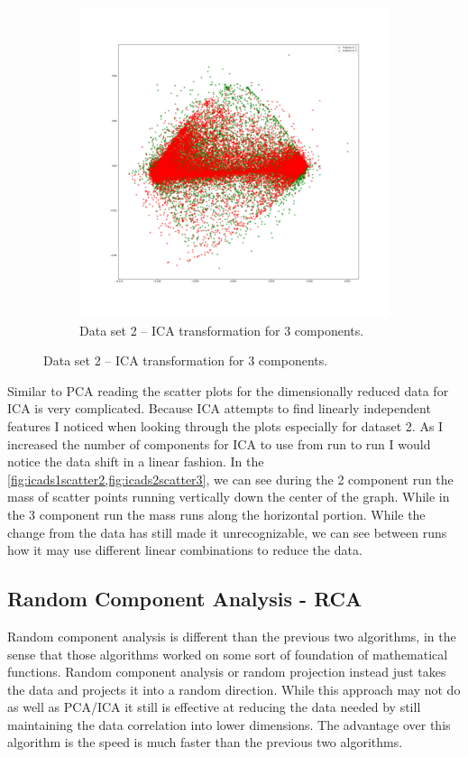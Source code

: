 \documentclass[
letterpaper, %
]{IEEEtran}
\begin{document}
	\begin{figure}[ht]\ContinuedFloat
		\begin{subfigure}{.5\textwidth}
			\centering
			\includegraphics[width=\linewidth]{./images/ds2/ica/scatter/3components.png}
			\caption{Data set 2 -- ICA transformation for 3 components.}
			\label{fig:icads2scatter3}
		\end{subfigure}
	\end{figure}

	Similar to PCA reading the scatter plots for the dimensionally reduced data for ICA is very complicated. Because ICA attempts to find linearly independent features I noticed when looking through the plots especially for dataset 2. As I increased the number of components for ICA to use from run to run I would notice the data shift in a linear fashion. In the \cref{fig:icads1scatter2,fig:icads2scatter3}, we can see during the 2 component run the mass of scatter points running vertically down the center of the graph. While in the 3 component run the mass runs along the horizontal portion. While the change from the data has still made it unrecognizable, we can see between runs how it may use different linear combinations to reduce the data. 
	
	\subsection{Random Component Analysis - RCA}
	Random component analysis is different than the previous two algorithms, in the sense that those algorithms worked on some sort of foundation of mathematical functions. Random component analysis or random projection instead just takes the data and projects it into a random direction. While this approach may not do as well as PCA/ICA it still is effective at reducing the data needed by still maintaining the data correlation into lower dimensions. The advantage over this algorithm is the speed is much faster than the previous two algorithms.
\end{document}
